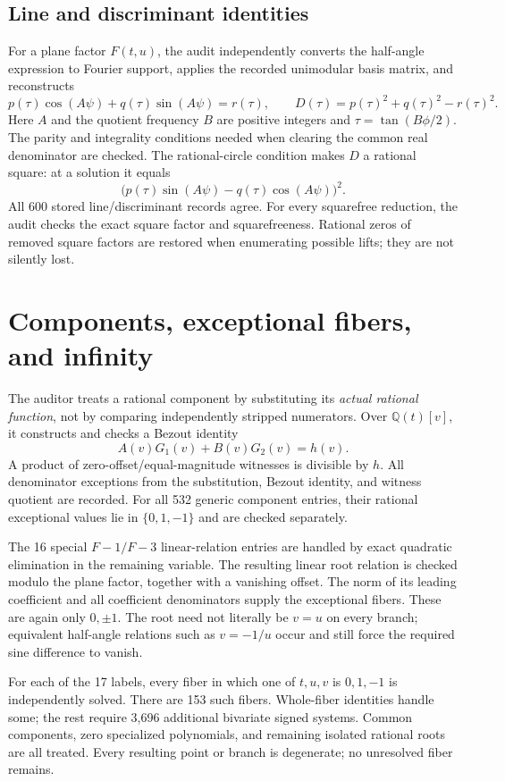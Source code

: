 \documentclass[11pt]{article}
\theoremstyle{remark}\newtheorem{remark}[theorem]{Remark}
\newcommand{\Q}{\mathbb Q}\newcommand{\Z}{\mathbb Z}
\begin{document}
\subsection{Line and discriminant identities}
For a plane factor $F(t,u)$, the audit independently converts the half-angle expression to Fourier support, applies the recorded unimodular basis matrix, and reconstructs
\[
p(\tau)\cos(A\psi)+q(\tau)\sin(A\psi)=r(\tau),
\qquad D(\tau)=p(\tau)^2+q(\tau)^2-r(\tau)^2.
\]
Here $A$ and the quotient frequency $B$ are positive integers and $\tau=\tan(B\phi/2)$. The parity and integrality conditions needed when clearing the common real denominator are checked. The rational-circle condition makes $D$ a rational square: at a solution it equals
\[
\bigl(p(\tau)\sin(A\psi)-q(\tau)\cos(A\psi)\bigr)^2.
\]
All 600 stored line/discriminant records agree. For every squarefree reduction, the audit checks the exact square factor and squarefreeness. Rational zeros of removed square factors are restored when enumerating possible lifts; they are not silently lost.

\section{Components, exceptional fibers, and infinity}
The auditor treats a rational component by substituting its \emph{actual rational function}, not by comparing independently stripped numerators. Over $\Q(t)[v]$, it constructs and checks a Bezout identity
\[
A(v)G_1(v)+B(v)G_2(v)=h(v).
\]
A product of zero-offset/equal-magnitude witnesses is divisible by $h$. All denominator exceptions from the substitution, Bezout identity, and witness quotient are recorded. For all 532 generic component entries, their rational exceptional values lie in $\{0,1,-1\}$ and are checked separately.

The 16 special $F{-}1/F{-}3$ linear-relation entries are handled by exact quadratic elimination in the remaining variable. The resulting linear root relation is checked modulo the plane factor, together with a vanishing offset. The norm of its leading coefficient and all coefficient denominators supply the exceptional fibers. These are again only $0,\pm1$. The root need not literally be $v=u$ on every branch; equivalent half-angle relations such as $v=-1/u$ occur and still force the required sine difference to vanish.

For each of the 17 labels, every fiber in which one of $t,u,v$ is $0,1,-1$ is independently solved. There are 153 such fibers. Whole-fiber identities handle some; the rest require 3,696 additional bivariate signed systems. Common components, zero specialized polynomials, and remaining isolated rational roots are all treated. Every resulting point or branch is degenerate; no unresolved fiber remains.
\end{document}
